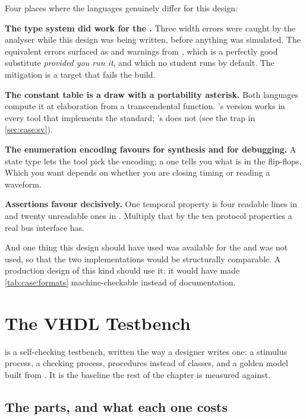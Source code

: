 Four places where the languages genuinely differ for this design:

\textbf{The type system did work for the \VHDL{}.} Three width errors were
caught by the analyser while this design was being written, before anything
was simulated. The equivalent \SV{} errors surfaced as  and
 warnings from , which is
a perfectly good substitute \emph{provided you run it}, and which no student
runs by default. The mitigation is a  target that fails the
build.

\textbf{The constant table is a draw with a portability asterisk.} Both
languages compute it at elaboration from a transcendental function. \VHDL{}'s
version works in every tool that implements the standard;
\SV{}'s does not (see the trap in \cref{sec:case:sv}).

\textbf{The enumeration encoding favours \VHDL{} for synthesis and \SV{} for
debugging.} A \VHDL{} state type lets the tool pick the encoding; a \SV{} one
tells you what is in the flip-flops. Which you want depends on whether you
are closing timing or reading a waveform.

\textbf{Assertions favour \SV{} decisively.} One temporal property is four
readable lines in \SV{} and twenty unreadable ones in \VHDL{}. Multiply that
by the ten protocol properties a real bus interface has.

\begin{notebox}{And one thing this design should have used}
 was available for the \VHDL{} and was not used, so
that the two implementations would be structurally comparable. A production
\VHDL{} design of this kind should use it: it would have made
\cref{tab:case:formats} machine-checkable instead of documentation.
\end{notebox}

\clearpage
\section{The VHDL Testbench}
\label{sec:case:vhdltb}

 is a self-checking \VHDL{} testbench, written the way a
\VHDL{} designer writes one: a stimulus process, a checking process,
procedures instead of classes, and a golden model built from
. It is the baseline the rest of the chapter is measured
against.

\subsection{The parts, and what each one costs}

